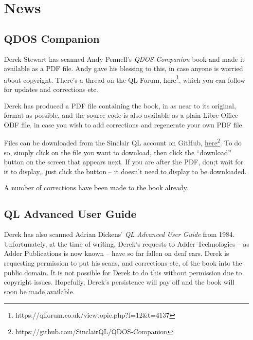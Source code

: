 
\chapter{News}

\section{QDOS Companion}

Derek Stewart has scanned Andy Pennell's \emph{QDOS Companion} book
and made it available as a PDF file. Andy gave his blessing to this,
in case anyone is worried about copyright. There's a thread on the
QL Forum, \href{https://qlforum.co.uk/viewtopic.php?f=12&t=4137}{here}\footnote{https://qlforum.co.uk/viewtopic.php?f=12\&t=4137},
which you can follow for updates and corrections etc.

Derek has produced a PDF file containing the book, in as near to its
original, format as possible, and the source code is also available
as a plain Libre Office ODF file, in case you wish to add corrections
and regenerate your own PDF file.

Files can be downloaded from the Sinclair QL account on GitHub, \href{https://github.com/SinclairQL/QDOS-Companion}{here}\footnote{https://github.com/SinclairQL/QDOS-Companion}.
To do so, simply click on the file you want to download, then click
the ``download'' button on the screen that appears next. If you
are after the PDF, don;t wait for it to display,. just click the button
-- it doesn't need to display to be downloaded.

A number of corrections have been made to the book already.

\section{QL Advanced User Guide}

Derek has also scanned Adrian Dickens' \emph{QL Advanced User Guide}
from 1984. Unfortunately, at the time of writing, Derek's requests
to Adder Technologies -- as Adder Publications is now known -- have
so far fallen on deaf ears. Derek is requesting permission to put
his scans, and corrections etc, of the book into the public domain.
It is not possible for Derek to do this without permission due to
copyright issues. Hopefully, Derek's persistence will pay off and
the book will soon be made available.
